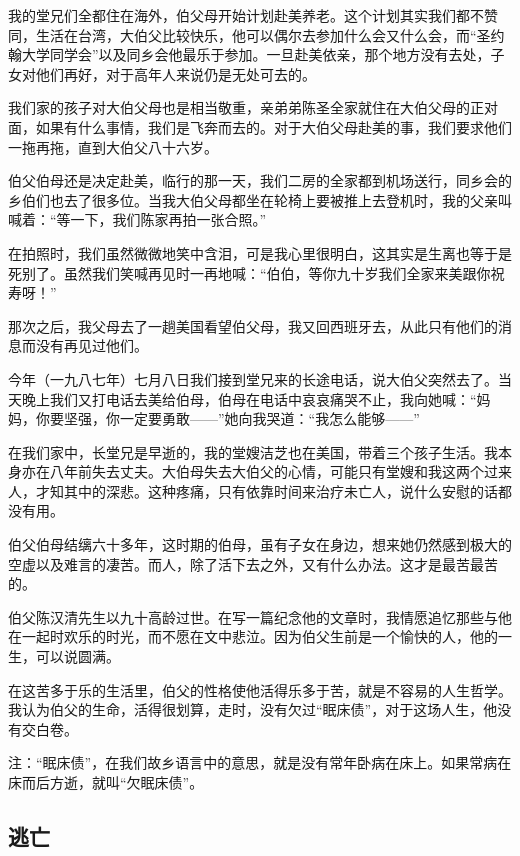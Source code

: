 \par 我的堂兄们全都住在海外，伯父母开始计划赴美养老。这个计划其实我们都不赞同，生活在台湾，大伯父比较快乐，他可以偶尔去参加什么会又什么会，而“圣约翰大学同学会”以及同乡会他最乐于参加。一旦赴美依亲，那个地方没有去处，子女对他们再好，对于高年人来说仍是无处可去的。
\par 我们家的孩子对大伯父母也是相当敬重，亲弟弟陈圣全家就住在大伯父母的正对面，如果有什么事情，我们是飞奔而去的。对于大伯父母赴美的事，我们要求他们一拖再拖，直到大伯父八十六岁。
\par 伯父伯母还是决定赴美，临行的那一天，我们二房的全家都到机场送行，同乡会的乡伯们也去了很多位。当我大伯父母都坐在轮椅上要被推上去登机时，我的父亲叫喊着：“等一下，我们陈家再拍一张合照。”
\par 在拍照时，我们虽然微微地笑中含泪，可是我心里很明白，这其实是生离也等于是死别了。虽然我们笑喊再见时一再地喊：“伯伯，等你九十岁我们全家来美跟你祝寿呀！”
\par 那次之后，我父母去了一趟美国看望伯父母，我又回西班牙去，从此只有他们的消息而没有再见过他们。
\par 今年（一九八七年）七月八日我们接到堂兄来的长途电话，说大伯父突然去了。当天晚上我们又打电话去美给伯母，伯母在电话中哀哀痛哭不止，我向她喊：“妈妈，你要坚强，你一定要勇敢——”她向我哭道：“我怎么能够——”
\par 在我们家中，长堂兄是早逝的，我的堂嫂洁芝也在美国，带着三个孩子生活。我本身亦在八年前失去丈夫。大伯母失去大伯父的心情，可能只有堂嫂和我这两个过来人，才知其中的深悲。这种疼痛，只有依靠时间来治疗未亡人，说什么安慰的话都没有用。
\par 伯父伯母结缡六十多年，这时期的伯母，虽有子女在身边，想来她仍然感到极大的空虚以及难言的凄苦。而人，除了活下去之外，又有什么办法。这才是最苦最苦的。
\par 伯父陈汉清先生以九十高龄过世。在写一篇纪念他的文章时，我情愿追忆那些与他在一起时欢乐的时光，而不愿在文中悲泣。因为伯父生前是一个愉快的人，他的一生，可以说圆满。
\par 在这苦多于乐的生活里，伯父的性格使他活得乐多于苦，就是不容易的人生哲学。我认为伯父的生命，活得很划算，走时，没有欠过“眠床债”，对于这场人生，他没有交白卷。
\par 
\par 注：“眠床债”，在我们故乡语言中的意思，就是没有常年卧病在床上。如果常病在床而后方逝，就叫“欠眠床债”。


\subsection{逃亡}

